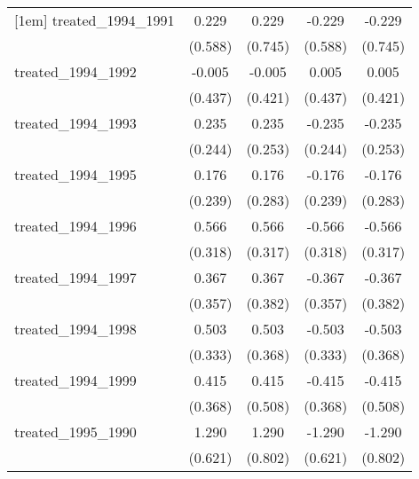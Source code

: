 {\begin{tabular}{l*{4}{c}}
[1em]
treated\_1994\_1991&       0.229         &       0.229         &      -0.229         &      -0.229         \\
            &     (0.588)         &     (0.745)         &     (0.588)         &     (0.745)         \\
[1em]
treated\_1994\_1992&      -0.005         &      -0.005         &       0.005         &       0.005         \\
            &     (0.437)         &     (0.421)         &     (0.437)         &     (0.421)         \\
[1em]
treated\_1994\_1993&       0.235         &       0.235         &      -0.235         &      -0.235         \\
            &     (0.244)         &     (0.253)         &     (0.244)         &     (0.253)         \\
[1em]
treated\_1994\_1995&       0.176         &       0.176         &      -0.176         &      -0.176         \\
            &     (0.239)         &     (0.283)         &     (0.239)         &     (0.283)         \\
[1em]
treated\_1994\_1996&       0.566         &       0.566         &      -0.566         &      -0.566         \\
            &     (0.318)         &     (0.317)         &     (0.318)         &     (0.317)         \\
[1em]
treated\_1994\_1997&       0.367         &       0.367         &      -0.367         &      -0.367         \\
            &     (0.357)         &     (0.382)         &     (0.357)         &     (0.382)         \\
[1em]
treated\_1994\_1998&       0.503         &       0.503         &      -0.503         &      -0.503         \\
            &     (0.333)         &     (0.368)         &     (0.333)         &     (0.368)         \\
[1em]
treated\_1994\_1999&       0.415         &       0.415         &      -0.415         &      -0.415         \\
            &     (0.368)         &     (0.508)         &     (0.368)         &     (0.508)         \\
[1em]
treated\_1995\_1990&       1.290\sym{*}  &       1.290         &      -1.290\sym{*}  &      -1.290         \\
            &     (0.621)         &     (0.802)         &     (0.621)         &     (0.802)         \\

\end{tabular}}
